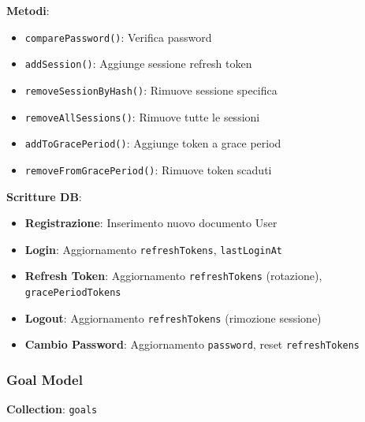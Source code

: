 \documentclass[11pt,a4paper]{article}
\begin{document}
\textbf{Metodi}:
\begin{itemize}
    \item \texttt{comparePassword()}: Verifica password
    \item \texttt{addSession()}: Aggiunge sessione refresh token
    \item \texttt{removeSessionByHash()}: Rimuove sessione specifica
    \item \texttt{removeAllSessions()}: Rimuove tutte le sessioni
    \item \texttt{addToGracePeriod()}: Aggiunge token a grace period
    \item \texttt{removeFromGracePeriod()}: Rimuove token scaduti
\end{itemize}

\textbf{Scritture DB}:
\begin{itemize}
    \item \textbf{Registrazione}: Inserimento nuovo documento User
    \item \textbf{Login}: Aggiornamento \texttt{refreshTokens}, \texttt{lastLoginAt}
    \item \textbf{Refresh Token}: Aggiornamento \texttt{refreshTokens} (rotazione), \texttt{gracePeriodTokens}
    \item \textbf{Logout}: Aggiornamento \texttt{refreshTokens} (rimozione sessione)
    \item \textbf{Cambio Password}: Aggiornamento \texttt{password}, reset \texttt{refreshTokens}
\end{itemize}

\subsubsection{Goal Model}

\textbf{Collection}: \texttt{goals}
\end{document}
